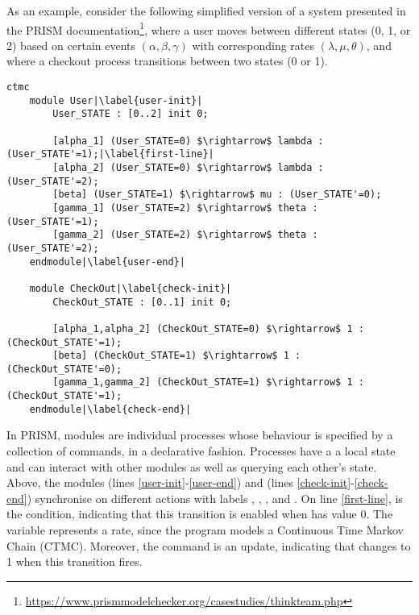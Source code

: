 As an example, consider the following simplified version of a system
presented in the PRISM
documentation\footnote{\url{https://www.prismmodelchecker.org/casestudies/thinkteam.php}},
where a user moves between different states (0, 1, or 2) based on
certain events $(\alpha, \beta, \gamma)$ with corresponding rates
$(\lambda, \mu, \theta)$, and where a checkout process transitions
between two states (0 or 1).
%
\begin{lstlisting}[style=prism-color,% caption={A PRISM example},captionpos=b,
  frame=none,label={example1},escapechar=|]
	ctmc 
	module User|\label{user-init}|
		User_STATE : [0..2] init 0;
	
		[alpha_1] (User_STATE=0) $\rightarrow$ lambda : (User_STATE'=1);|\label{first-line}|
		[alpha_2] (User_STATE=0) $\rightarrow$ lambda : (User_STATE'=2);
		[beta] (User_STATE=1) $\rightarrow$ mu : (User_STATE'=0);
		[gamma_1] (User_STATE=2) $\rightarrow$ theta : (User_STATE'=1);
		[gamma_2] (User_STATE=2) $\rightarrow$ theta : (User_STATE'=2);
	endmodule|\label{user-end}|
	
	module CheckOut|\label{check-init}|
		CheckOut_STATE : [0..1] init 0;
	
		[alpha_1,alpha_2] (CheckOut_STATE=0) $\rightarrow$ 1 : (CheckOut_STATE'=1);
		[beta] (CheckOut_STATE=1) $\rightarrow$ 1 : (CheckOut_STATE'=0);
		[gamma_1,gamma_2] (CheckOut_STATE=1) $\rightarrow$ 1 : (CheckOut_STATE'=1);
	endmodule|\label{check-end}|
\end{lstlisting}
%
In PRISM, modules are individual processes whose behaviour is
specified by a collection of commands, in a declarative fashion.
Processes have a a local state and can interact with other modules as
well as querying each other's state. Above, the modules
 (lines \ref{user-init}-\ref{user-end}) and
 (lines \ref{check-init}-\ref{check-end})
synchronise on different actions with labels ,
, ,  and
. On line \ref{first-line},
 is the condition, indicating that this
transition is enabled when  has value 0. The
variable  represents a rate, since the program
models a Continuous Time Markov Chain (CTMC). Moreover, the command
 is an update, indicating that
 changes to 1 when this transition fires.

